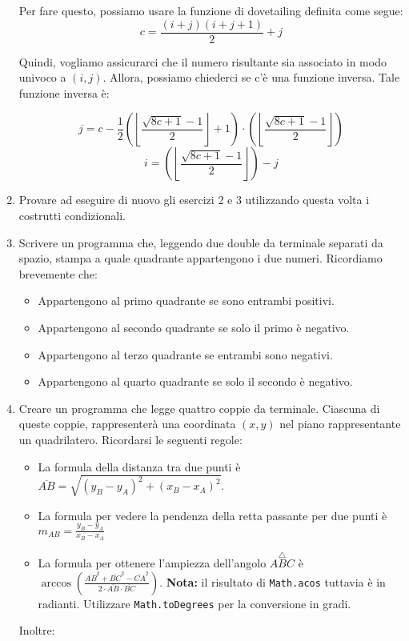 \documentclass[]{scrartcl}
\begin{document}
\begin{enumerate}
Per fare questo, possiamo usare la funzione di dovetailing definita come segue:
\[c = \frac{(i+j)(i+j+1)}{2} + j\]

Quindi, vogliamo assicurarci che il numero risultante sia associato in modo univoco a $ (i, j) $. Allora, possiamo chiederci se c'è una funzione inversa. Tale funzione inversa è:

\[j = c - \frac{1}{2}\left(\left\lfloor\frac{\sqrt{8c+1}-1}{2}\right\rfloor + 1\right) \cdot\left(\left\lfloor\frac{\sqrt{8c+1}-1}{2}\right\rfloor\right)\]
\[i = \left(\left\lfloor\frac{\sqrt{8c+1}-1}{2}\right\rfloor\right)-j\]

\color{red}
\item Provare ad eseguire di nuovo gli esercizi 2 e 3  utilizzando questa volta i costrutti condizionali.
\item Scrivere un programma che, leggendo due double da terminale separati da spazio, stampa a quale quadrante appartengono i due numeri.
Ricordiamo brevemente che:
\begin{itemize}
	\item Appartengono al primo quadrante se sono entrambi positivi.
	\item Appartengono al secondo quadrante se solo il primo è negativo.
	\item Appartengono al terzo quadrante se entrambi sono negativi.
	\item Appartengono al quarto quadrante se solo il secondo è negativo.
\end{itemize}
\item Creare un programma che legge quattro coppie da terminale. Ciascuna di queste coppie, rappresenterà una coordinata $(x,y)$ nel piano rappresentante un quadrilatero. Ricordarsi le seguenti regole:
\begin{itemize}
	\item La formula della distanza tra due punti è $\overline{AB}=\sqrt{(y_B-y_A)^2+(x_B-x_A)^2}$.
	\item La formula per vedere la pendenza della retta passante per due punti è $m_{AB}=\frac{y_B-y_A}{x_B-x_A}$
	\item La formula per ottenere l'ampiezza dell'angolo $\stackrel{\bigtriangleup}{ABC}$ è $\arccos\left(\frac{\overline{AB}^2+\overline{BC}^2-\overline{CA}^2}{2\cdot \overline{AB}\cdot \overline{BC}}\right)$. \textbf{Nota:} il risultato di \texttt{Math.acos} tuttavia è in radianti. Utilizzare \texttt{Math.toDegrees} per la conversione in gradi.
\end{itemize}
Inoltre:
\begin{itemize}

\end{itemize}
\end{enumerate}
\end{document}
